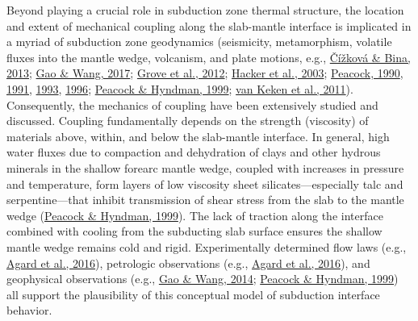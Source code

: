 \documentclass[draft,linenumbers]{agujournal2018}
\begin{document}
Beyond playing a crucial role in subduction zone thermal structure, the
location and extent of mechanical coupling along the slab-mantle
interface is implicated in a myriad of subduction zone geodynamics
(seismicity, metamorphism, volatile fluxes into the mantle wedge,
volcanism, and plate motions, e.g.,
\protect\hyperlink{ref-Cizkova2013}{Čížková \& Bina, 2013};
\protect\hyperlink{ref-Gao2017}{Gao \& Wang, 2017};
\protect\hyperlink{ref-Grove2012}{Grove et al., 2012};
\protect\hyperlink{ref-Hacker2003}{Hacker et al., 2003};
\protect\hyperlink{ref-Peacock1990}{Peacock, 1990},
\protect\hyperlink{ref-Peacock1991}{1991},
\protect\hyperlink{ref-Peacock1993}{1993},
\protect\hyperlink{ref-Peacock1996}{1996};
\protect\hyperlink{ref-Peacock1999a}{Peacock \& Hyndman, 1999};
\protect\hyperlink{ref-VanKeken2011}{van Keken et al., 2011}).
Consequently, the mechanics of coupling have been extensively studied
and discussed. Coupling fundamentally depends on the strength
(viscosity) of materials above, within, and below the slab-mantle
interface. In general, high water fluxes due to compaction and
dehydration of clays and other hydrous minerals in the shallow forearc
mantle wedge, coupled with increases in pressure and temperature, form
layers of low viscosity sheet silicates---especially talc and
serpentine---that inhibit transmission of shear stress from the slab to
the mantle wedge (\protect\hyperlink{ref-Peacock1999a}{Peacock \&
Hyndman, 1999}). The lack of traction along the interface combined with
cooling from the subducting slab surface ensures the shallow mantle
wedge remains cold and rigid. Experimentally determined flow laws (e.g.,
\protect\hyperlink{ref-Agard2016}{Agard et al., 2016}), petrologic
observations (e.g., \protect\hyperlink{ref-Agard2016}{Agard et al.,
2016}), and geophysical observations (e.g.,
\protect\hyperlink{ref-Gao2014}{Gao \& Wang, 2014};
\protect\hyperlink{ref-Peacock1999a}{Peacock \& Hyndman, 1999}) all
support the plausibility of this conceptual model of subduction
interface behavior.
\end{document}
